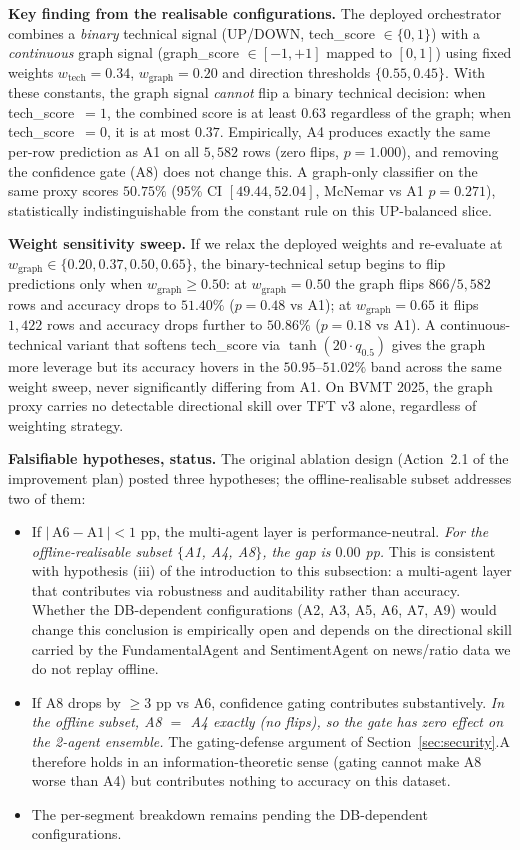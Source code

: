 \documentclass[conference]{IEEEtran}
\begin{document}
\textbf{Key finding from the realisable configurations.} The deployed orchestrator combines a \emph{binary} technical signal (UP/DOWN, tech\_score $\in\{0,1\}$) with a \emph{continuous} graph signal (graph\_score $\in[-1,+1]$ mapped to $[0,1]$) using fixed weights $w_\text{tech}\!=\!0.34$, $w_\text{graph}\!=\!0.20$ and direction thresholds $\{0.55, 0.45\}$. With these constants, the graph signal \emph{cannot} flip a binary technical decision: when tech\_score~$=1$, the combined score is at least $0.63$ regardless of the graph; when tech\_score~$=0$, it is at most $0.37$. Empirically, A4 produces exactly the same per-row prediction as A1 on all $5{,}582$ rows (zero flips, $p = 1.000$), and removing the confidence gate (A8) does not change this. A graph-only classifier on the same proxy scores $50.75\%$ (95\% CI $[49.44, 52.04]$, McNemar vs A1 $p = 0.271$), statistically indistinguishable from the constant rule on this UP-balanced slice.

\textbf{Weight sensitivity sweep.} If we relax the deployed weights and re-evaluate at $w_\text{graph}\!\in\!\{0.20, 0.37, 0.50, 0.65\}$, the binary-technical setup begins to flip predictions only when $w_\text{graph}\!\ge\!0.50$: at $w_\text{graph}\!=\!0.50$ the graph flips $866/5{,}582$ rows and accuracy drops to $51.40\%$ ($p = 0.48$ vs A1); at $w_\text{graph}\!=\!0.65$ it flips $1{,}422$ rows and accuracy drops further to $50.86\%$ ($p = 0.18$ vs A1). A continuous-technical variant that softens tech\_score via $\tanh(20 \cdot q_{0.5})$ gives the graph more leverage but its accuracy hovers in the $50.95$--$51.02\%$ band across the same weight sweep, never significantly differing from A1. On BVMT 2025, the graph proxy carries no detectable directional skill over TFT v3 alone, regardless of weighting strategy.

\textbf{Falsifiable hypotheses, status.} The original ablation design (Action~2.1 of the improvement plan) posted three hypotheses; the offline-realisable subset addresses two of them:
\begin{itemize}
\item If $|\,\text{A6} - \text{A1}\,|<1$ pp, the multi-agent layer is performance-neutral. \emph{For the offline-realisable subset $\{$A1, A4, A8$\}$, the gap is $0.00$ pp.} This is consistent with hypothesis (iii) of the introduction to this subsection: a multi-agent layer that contributes via robustness and auditability rather than accuracy. Whether the DB-dependent configurations (A2, A3, A5, A6, A7, A9) would change this conclusion is empirically open and depends on the directional skill carried by the FundamentalAgent and SentimentAgent on news/ratio data we do not replay offline.
\item If A8 drops by $\geq 3$ pp vs A6, confidence gating contributes substantively. \emph{In the offline subset, A8 $=$ A4 exactly (no flips), so the gate has zero effect on the 2-agent ensemble.} The gating-defense argument of Section~\ref{sec:security}.A therefore holds in an information-theoretic sense (gating cannot make A8 worse than A4) but contributes nothing to accuracy on this dataset.
\item The per-segment breakdown remains pending the DB-dependent configurations.
\end{itemize}
\end{document}
